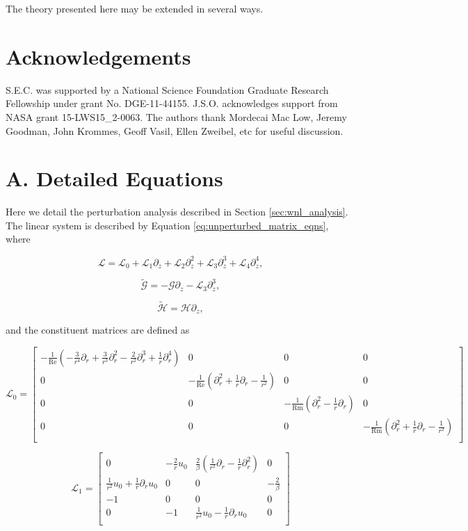 \documentclass{emulateapj}
\newcommand{\beq}{\begin{equation}}
\newcommand{\eeq}{\end{equation}}
\newcommand\reye{\mathrm{Re}}
\newcommand\reym{\mathrm{Rm}}
\begin{document}
The theory presented here may be extended in several ways. 

\section{Acknowledgements}
S.E.C. was supported by a National Science Foundation Graduate Research Fellowship under grant No. DGE-11-44155. J.S.O. acknowledges support from NASA grant 15-LWS15\_2-0063. The authors thank Mordecai Mac Low, Jeremy Goodman, John Krommes, Geoff Vasil, Ellen Zweibel, etc for useful discussion.



\clearpage
\appendix

\section{A. Detailed Equations}\label{app:basic_equations}

Here we detail the perturbation analysis described in Section \ref{sec:wnl_analysis}. The linear system is described by Equation \ref{eq:unperturbed_matrix_eqns}, where 

\beq
\mathcal{L} = \mathcal{L}_0 + \mathcal{L}_1 \partial_z + \mathcal{L}_2 \partial_z^2 + \mathcal{L}_3 \partial_z^3 + \mathcal{L}_4 \partial_z^4,
\eeq

\beq
\widetilde{\mathcal{G}} = - \mathcal{G} \partial_z - \mathcal{L}_3 \partial_z^3,
\eeq

\beq
\widetilde{\mathcal{H}} = \mathcal{H} \partial_z,
\eeq

and the constituent matrices are defined as 

\beq
\mathcal{L}_0 = \left[\begin{matrix}
-\frac{1}{\reye} (-\frac{3}{r^4} \partial_r + \frac{3}{r^3}\partial_r^2 - \frac{2}{r^2}\partial_r^3 + \frac{1}{r}\partial_r^4) & 0 & 0 & 0 \\
0 & -\frac{1}{\reye} (\partial_r^2 + \frac{1}{r}\partial_r - \frac{1}{r^2}) & 0 & 0 \\
0 & 0 & -\frac{1}{\reym} (\partial_r^2 - \frac{1}{r} \partial_r) & 0 \\
0 & 0 & 0 & -\frac{1}{\reym} (\partial_r^2 + \frac{1}{r}\partial_r - \frac{1}{r^2}) \\
\end{matrix}\right]
\eeq

\beq
\mathcal{L}_1 = \left[\begin{matrix}
0 & -\frac{2}{r} u_0 & \frac{2}{\beta} (\frac{1}{r^2} \partial_r - \frac{1}{r}\partial_r^2) & 0 \\
\frac{1}{r^2} u_0 + \frac{1}{r}\partial_r u_0 & 0 & 0 & -\frac{2}{\beta} \\
-1 & 0 & 0 & 0 \\
0 & -1 & \frac{1}{r^2} u_0 - \frac{1}{r} \partial_r u_0 & 0 \\
\end{matrix}\right]
\eeq
\end{document}

